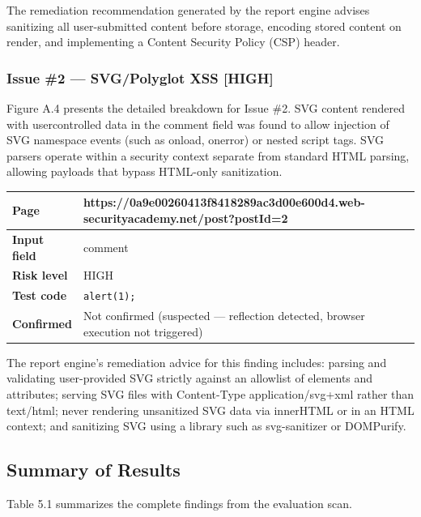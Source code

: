 The remediation recommendation generated by the report engine advises sanitizing all
user-submitted content before storage, encoding stored content on render, and
implementing a Content Security Policy (CSP) header.

\subsubsection{ Issue \#2 — SVG/Polyglot XSS [HIGH]}
Figure A.4 presents the detailed breakdown for Issue \#2. SVG content rendered with usercontrolled data in the comment field was found to allow injection of SVG namespace
events (such as onload, onerror) or nested script tags. SVG parsers operate within a
security context separate from standard HTML parsing, allowing payloads that bypass
HTML-only sanitization.

\begin{table}[h]
\centering
\begin{tabular}{|l|p{10cm}|}
\hline
\textbf{Page} & https://0a9e00260413f8418289ac3d00e600d4.web-securityacademy.net/post?postId=2 \\ \hline
\textbf{Input field} & comment \\ \hline
\textbf{Risk level} & HIGH \\ \hline
\textbf{Test code} & \texttt{alert(1);} \\ \hline
\textbf{Confirmed} & Not confirmed (suspected — reflection detected, browser execution not triggered) \\ \hline
\end{tabular}
\end{table}
The report engine's remediation advice for this finding includes: parsing and validating user-provided SVG strictly against an allowlist of elements and attributes; serving SVG files with Content-Type application/svg+xml rather than text/html; never rendering unsanitized SVG data via innerHTML or in an HTML context; and sanitizing SVG using a library such as svg-sanitizer or DOMPurify.

\subsection{Summary of Results}
Table 5.1 summarizes the complete findings from the evaluation scan.

